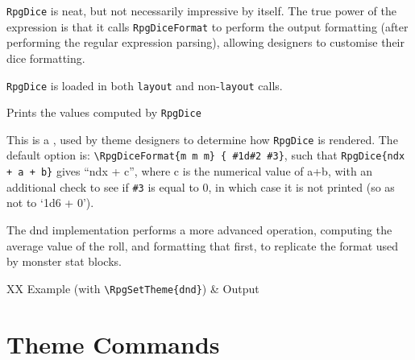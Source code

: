 \begin{macrolist}
{					\verb|RpgDice| is neat, but not necessarily impressive by itself. The true power of the expression is that it calls \verb|RpgDiceFormat| to perform the output formatting (after performing the regular expression parsing), allowing designers to customise their dice formatting.

					\verb|RpgDice| is loaded in both \verb|layout| and non-\verb|layout| calls.
				}
		
				{Prints the values computed by \verb|RpgDice|
				}
				{
				}
				{
					This is a \placeholderCommand{}, used by theme designers to determine how \verb|RpgDice| is rendered. The default option is:
					\verb|\RpgDiceFormat{m m m} { #1d#2 #3}|, such that \verb|RpgDice{ndx + a + b}| gives ``ndx + c'', where c is the numerical value of a+b, with an additional check to see if \verb|#3| is equal to 0, in which case it is not printed (so as not to `1d6 + 0'). 
					
					The dnd implementation performs a more advanced operation, computing the average value of the roll, and formatting that first, to replicate the format used by monster stat blocks. 


					
					\begin{RpgTable}{XX}
						Example (with \verb|\RpgSetTheme{dnd}|) & Output \\
					\end{RpgTable}

				
				}
		\end{macrolist}

		
	\section{Theme Commands}

